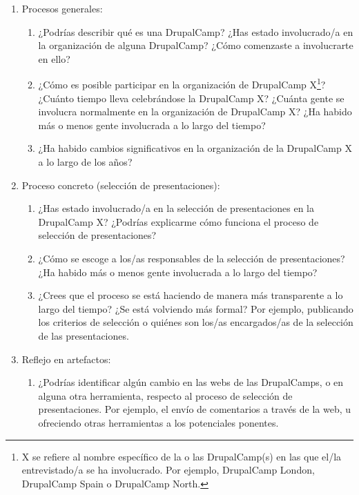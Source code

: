 \begin{enumerate}
\begin{enumerate}
			\item Procesos generales:
			\begin{enumerate}	
				\item ¿Podrías describir qué es una DrupalCamp? ¿Has estado involucrado/a en la organización de alguna DrupalCamp? ¿Cómo comenzaste a involucrarte en ello?
				\item ¿Cómo es posible participar en la organización de DrupalCamp X\footnote{X se refiere al nombre específico de la o las DrupalCamp(s) en las que el/la entrevistado/a se ha involucrado. Por ejemplo, DrupalCamp London, DrupalCamp Spain o DrupalCamp North.}? ¿Cuánto tiempo lleva celebrándose la DrupalCamp X? ¿Cuánta gente se involucra normalmente en la organización de DrupalCamp X? ¿Ha habido más o menos gente involucrada a lo largo del tiempo?	
				\item ¿Ha habido cambios significativos en la organización de la DrupalCamp X a lo largo de los años?
			\end{enumerate}			
	
			\item Proceso concreto (selección de presentaciones):
			\begin{enumerate}			
				\item ¿Has estado involucrado/a en la selección de presentaciones en la DrupalCamp X? ¿Podrías explicarme cómo funciona el proceso de selección de presentaciones?
				\item ¿Cómo se escoge a los/as responsables de la selección de presentaciones? ¿Ha habido más o menos gente involucrada a lo largo del tiempo?
				\item ¿Crees que el proceso se está haciendo de manera más transparente a lo largo del tiempo? ¿Se está volviendo más formal? Por ejemplo, publicando los criterios de selección o quiénes son los/as encargados/as de la selección de las presentaciones.
			\end{enumerate}		
				
			\item Reflejo en artefactos:
			\begin{enumerate}				
				\item ¿Podrías identificar algún cambio en las webs de las DrupalCamps, o en alguna otra herramienta, respecto al proceso de selección de presentaciones. Por ejemplo, el envío de comentarios a través de la web, u ofreciendo otras herramientas a los potenciales ponentes.
			\end{enumerate}			
		\end{enumerate}
		

\end{enumerate}
